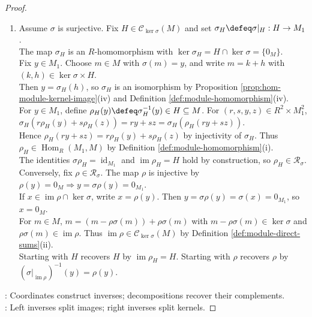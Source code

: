 \begin{theorem}
\begin{proof}
\begin{enumerate}[label=(\roman*)]
Start with $H$, recover $H$ by $\ker\lambda_H=H$. Start with $\lambda$, recover $\lambda$ by decomposition $y=\sigma\lambda(y)+(y-\sigma\lambda(y))$, injectivity of $\sigma$.
\item Assume $\sigma$ is surjective. Fix $H\in\mathcal{C}_{\ker\sigma}(M)$ and set $\sigma_H\defeq\sigma|_H:H\to M_1$.\\
The map $\sigma_H$ is an $R$-homomorphism with $\ker\sigma_H=H\cap\ker\sigma=\{0_M\}$.\\
Fix $y\in M_1$. Choose $m\in M$ with $\sigma(m)=y$, and write $m=k+h$ with $(k,h)\in\ker\sigma\times H$.\\
Then $y=\sigma_H(h)$, so $\sigma_H$ is an isomorphism by Proposition \ref{prop:hom-module-kernel-image}(iv) and Definition \ref{def:module-homomorphism}(iv).\\
For $y\in M_1$, define $\rho_H(y)\defeq\sigma_H^{-1}(y)\in H\subseteq M$. For $(r,s,y,z)\in R^2\times M_1^2$, $\sigma_H(r\rho_H(y)+s\rho_H(z))=ry+sz=\sigma_H(\rho_H(ry+sz))$.\\
Hence $\rho_H(ry+sz)=r\rho_H(y)+s\rho_H(z)$ by injectivity of $\sigma_H$. Thus $\rho_H\in\operatorname{Hom}_R(M_1,M)$ by Definition \ref{def:module-homomorphism}(i).\\
The identities $\sigma\rho_H=\operatorname{id}_{M_1}$ and $\operatorname{im}\rho_H=H$ hold by construction, so $\rho_H\in\mathcal{R}_\sigma$.\\
Conversely, fix $\rho\in\mathcal{R}_\sigma$. The map $\rho$ is injective by $\rho(y)=0_M\Rightarrow y=\sigma\rho(y)=0_{M_1}$.\\
If $x\in\operatorname{im}\rho\cap\ker\sigma$, write $x=\rho(y)$. Then $y=\sigma\rho(y)=\sigma(x)=0_{M_1}$, so $x=0_M$.\\
For $m\in M$, $m=(m-\rho\sigma(m))+\rho\sigma(m)$ with $m-\rho\sigma(m)\in\ker\sigma$ and $\rho\sigma(m)\in\operatorname{im}\rho$. Thus $\operatorname{im}\rho\in\mathcal{C}_{\ker\sigma}(M)$ by Definition \ref{def:module-direct-sums}(ii).\\
Starting with $H$ recovers $H$ by $\operatorname{im}\rho_H=H$. Starting with $\rho$ recovers $\rho$ by $(\sigma|_{\operatorname{im}\rho})^{-1}(y)=\rho(y)$.
\end{enumerate}
: Coordinates construct inverses; decompositions recover their complements.\\
: Left inverses split images; right inverses split kernels.
\end{proof}
\end{theorem}
